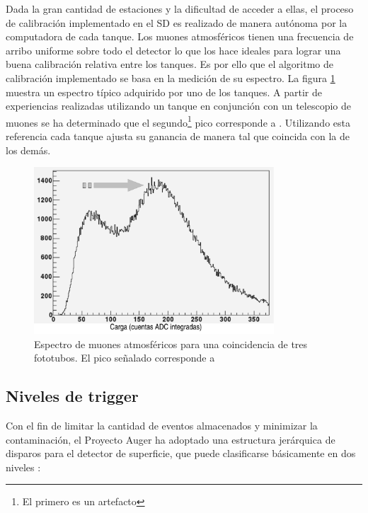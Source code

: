		Dada la gran cantidad de estaciones y la dificultad de acceder a ellas, el proceso de calibraci\'on implementado en el SD es realizado de manera aut\'onoma por la computadora de cada tanque. 
		Los muones atmosf\'ericos tienen una frecuencia de arribo uniforme sobre todo el detector lo que los hace ideales para lograr una buena calibraci\'on relativa entre los tanques. 
		Es por ello que el algoritmo de calibraci\'on implementado se basa en la medici\'on de su espectro. 
		La figura \ref{Calibracion_Muones} muestra un espectro t\'ipico adquirido por uno de los tanques. 
		A partir de experiencias realizadas utilizando un tanque en conjunci\'on con un telescopio de muones se ha determinado que el segundo\footnote{El primero es un artefacto} pico corresponde a . 
		Utilizando esta referencia cada tanque ajusta su ganancia de manera tal que coincida con la de los dem\'as.
		
		\begin{figure}[ht]
			\begin{center}
			\includegraphics[width=0.8\textwidth]{fig/detectorAuger/vem}
			\caption{Espectro de muones atmosf\'ericos para una coincidencia de tres fototubos. El pico se\~nalado corresponde a }
			\label{Calibracion_Muones}
			\end{center}
		\end{figure}
		
		
		\subsection{Niveles de trigger}
		\label{sbsc:trig_levels}
		
		Con el fin de limitar la cantidad de eventos almacenados y minimizar la contaminaci\'on, el Proyecto Auger ha adoptado una estructura jer\'arquica de disparos para el detector de superficie, que puede clasificarse b\'asicamente en dos niveles \cite{icrctri}:
		
